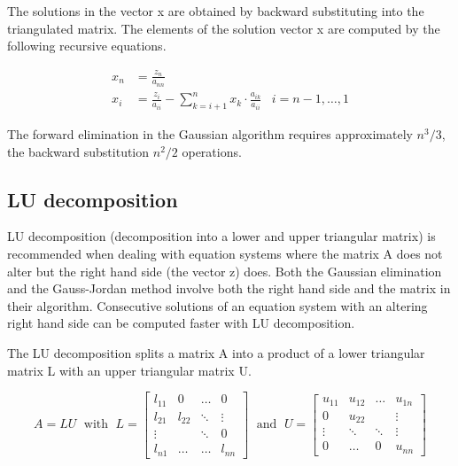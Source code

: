 \documentclass[10pt]{report}
\begin{document}
The solutions in the vector x are obtained by backward substituting
into the triangulated matrix.  The elements of the solution vector x
are computed by the following recursive equations.

\begin{align}
x_{n} &= \frac{z_{n}}{a_{nn}}\\
x_{i} &= \frac{z_{i}}{a_{ii}} - \sum_{k=i+1}^{n} x_{k}\cdot \frac{a_{ik}}{a_{ii}} & i = n - 1,\ldots,1
\end{align}

The forward elimination in the Gaussian algorithm requires
approximately $n^3/3$, the backward substitution $n^2/2$ operations.

\subsection{LU decomposition}

LU decomposition (decomposition into a lower and upper triangular
matrix) is recommended when dealing with equation systems where the
matrix A does not alter but the right hand side (the vector z) does.
Both the Gaussian elimination and the Gauss-Jordan method involve both
the right hand side and the matrix in their algorithm.  Consecutive
solutions of an equation system with an altering right hand side can
be computed faster with LU decomposition.

\addvspace{12pt}

The LU decomposition splits a matrix A into a product of a lower
triangular matrix L with an upper triangular matrix U.

\begin{equation}
A = L U \;\text{ with }\;
L = 
\begin{bmatrix}
l_{11} & 0 & \ldots & 0\\
l_{21} & l_{22} & \ddots & \vdots\\
\vdots &  & \ddots & 0\\
l_{n1} & \ldots & \ldots & l_{nn}
\end{bmatrix}
\;\text{ and }\;
U =
\begin{bmatrix}
u_{11} & u_{12} & \ldots & u_{1n}\\
0 & u_{22} &  & \vdots\\
\vdots & \ddots & \ddots & \vdots\\
0 & \ldots & 0 & u_{nn}
\end{bmatrix}
\end{equation}
\end{document}
